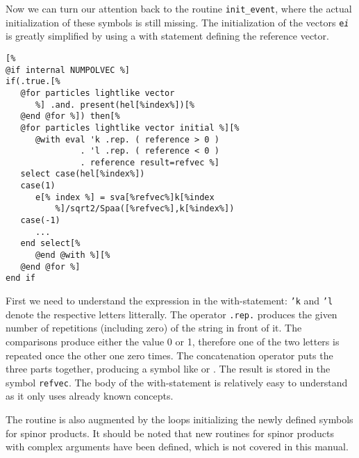 \documentclass[11pt,a4paper]{refrep}
\begin{document}
Now we can turn our attention back to the routine
\texttt{init\hspace{0pt}\_event}, where the actual initialization of
these symbols is still missing. The initialization of the vectors
\texttt{e\it i} is greatly simplified by using a with statement defining
the reference vector.
\begin{lstlisting}
[%
@if internal NUMPOLVEC %]
if(.true.[%
   @for particles lightlike vector
      %] .and. present(hel[%index%])[%
   @end @for %]) then[%
   @for particles lightlike vector initial %][%
      @with eval 'k .rep. ( reference > 0 )
               . 'l .rep. ( reference < 0 )
               . reference result=refvec %]
   select case(hel[%index%])
   case(1)
      e[% index %] = sva[%refvec%]k[%index
          %]/sqrt2/Spaa([%refvec%],k[%index%])
   case(-1)
      ...
   end select[%
      @end @with %][%
   @end @for %]
end if
\end{lstlisting}

First we need to understand the expression in the with-statement:
\texttt{'k} and \texttt{'l} denote the respective letters litterally.
The operator \texttt{.rep.} produces the given number of repetitions
(including zero) of the string in front of it. The comparisons produce
either the value 0 or 1, therefore one of the two letters is repeated
once the other one zero times. The concatenation operator puts the three
parts together, producing a symbol like  or . The
result is stored in the symbol \texttt{refvec}. The body of the with-statement
is relatively easy to understand as it only uses already known concepts.

The routine is also augmented by the loops initializing the newly defined
symbols for spinor products. It should be noted that new routines for spinor
products with complex arguments have been defined, which is not covered
in this manual.
\end{document}
